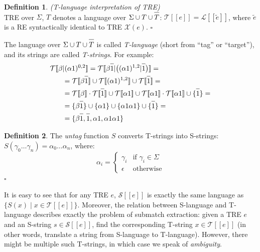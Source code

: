 \documentclass{article}
\newcommand{\Xin}{\!\in\!}
\newcommand{\Xeq}{\!=\!}
\newcommand{\Xlb}{[\![}
\newcommand{\Xrb}{]\!]}
\newcommand{\XL}{\mathcal{L}}
\newcommand{\XS}{\mathcal{S}}
\newcommand{\XT}{\mathcal{T}}
\newcommand{\XX}{\mathcal{X}}
\newcommand*{\Xbar}[1]{\overline{#1\vphantom{\bar{#1}}}}
\theoremstyle{definition}
\newtheorem{Xdef}{Definition}
\begin{document}
\begin{multicols}{2}
    \begin{Xdef}\label{deftlang}
    \emph{(T-language interpretation of TRE)} \\
    TRE over $\Sigma$, $T$ denotes a language over $\Sigma \cup T \cup \Xbar{T}$:
    $\XT \Xlb e \Xrb = \XL \Xlb \widetilde{e} \Xrb$, where $\widetilde{e}$ is a RE
    syntactically identical to TRE $\XX(e)$.
    $\square$
    \end{Xdef}

The language over $\Sigma \cup T \cup \Xbar{T}$ is called \emph{T-language}
(short from ``tag'' or ``target''), and its strings are called \emph{T-strings}.
For example:
\begin{align*}
    \XT \Xlb \beta &| (\alpha 1)^{0,2} \Xrb
=
    \XT \Xlb \beta \Xbar{1} | \big( (\alpha 1)^{1,2} | \Xbar{1} \big) \Xrb = \\
&=
    \XT \Xlb \beta \Xbar{1} \Xrb
        \cup \XT \Xlb (\alpha 1)^{1,2} \Xrb
        \cup \XT \Xlb \Xbar{1} \Xrb = \\
&=
    \XT \Xlb \beta \Xrb
        \cdot \XT \Xlb \Xbar{1} \Xrb \cup
    \XT \Xlb \alpha 1 \Xrb
            \cup \XT \Xlb \alpha 1 \Xrb \cdot \XT \Xlb \alpha 1 \Xrb
        \cup \{\Xbar{1}\} = \\
&=
    \{\beta \Xbar{1}\} \cup
    \{\alpha 1 \} \cup
    \{\alpha 1 \alpha 1 \} \cup
    \{\Xbar{1}\} = \\
&=
    \{\beta \Xbar{1}, \Xbar{1}, \alpha 1, \alpha 1 \alpha 1 \}
\end{align*}

    \begin{Xdef}\label{untag}
    The \emph{untag} function $S$ converts T-strings into S-strings:
    $S(\gamma_0 \dots \gamma_n) \Xeq \alpha_0 \dots \alpha_n$, where:
    $$\alpha_i = \begin{cases}
            \gamma_i &\text{if } \gamma_i \Xin \Sigma \\[-0.5em]
            \epsilon &\text{otherwise}
        \end{cases}$$
    $\square$
    \end{Xdef}

It is easy to see that for any TRE $e$, $\XS \Xlb e \Xrb$
is exactly the same language as $\{S(x) \mid x \Xin \XT \Xlb e \Xrb\}$.
Moreover, the relation between S-language and T-language
describes exactly the problem of submatch extraction:
given a TRE $e$ and an S-string $s \Xin \XS \Xlb e \Xrb$,
find the corresponding T-string $x \Xin \XT \Xlb e \Xrb$
(in other words, translate a string from S-language to T-language).
However, there might be multiple such T-strings, in which case we speak of \emph{ambiguity}.


\end{multicols}
\end{document}
